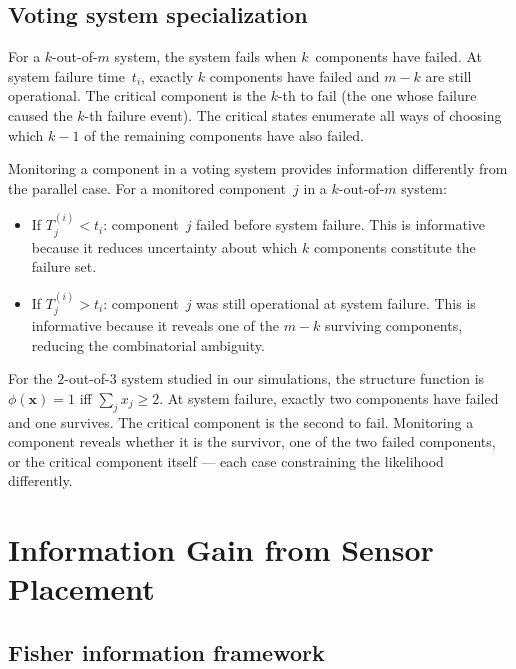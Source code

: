 \documentclass[12pt]{article}
\theoremstyle{definition}
\theoremstyle{remark}
\begin{document}
\subsection{Voting system specialization}
\label{sec:voting-ll}

For a $k$-out-of-$m$ system, the system fails when $k$~components have
failed.  At system failure time~$t_i$, exactly $k$ components have
failed and $m - k$ are still operational.  The critical component is
the $k$-th to fail (the one whose failure caused the $k$-th failure
event).  The critical states enumerate all ways of choosing which
$k - 1$ of the remaining components have also failed.

Monitoring a component in a voting system provides information
differently from the parallel case.  For a monitored component~$j$ in
a $k$-out-of-$m$ system:
\begin{itemize}
  \item If $T_j^{(i)} < t_i$: component~$j$ failed before system
    failure.  This is informative because it reduces uncertainty about
    which $k$ components constitute the failure set.
  \item If $T_j^{(i)} > t_i$: component~$j$ was still operational at
    system failure.  This is informative because it reveals one of the
    $m - k$ surviving components, reducing the combinatorial ambiguity.
\end{itemize}

For the $2$-out-of-$3$ system studied in our simulations, the structure
function is $\phi(\mathbf{x}) = 1$ iff $\sum_j x_j \geq 2$.  At
system failure, exactly two components have failed and one survives.
The critical component is the second to fail.  Monitoring a component
reveals whether it is the survivor, one of the two failed components,
or the critical component itself --- each case constraining the
likelihood differently.


\section{Information Gain from Sensor Placement}
\label{sec:information}

\subsection{Fisher information framework}
\label{sec:fisher-framework}
\end{document}

